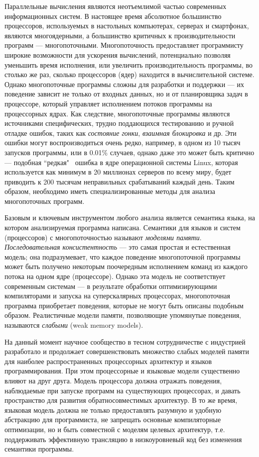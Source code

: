 
{\actuality}
Параллельные вычисления являются неотъемлимой частью современных
информационных систем. В настоящее время абсолютное большинство процессоров, используемых
в настольных компьютерах, серверах и смартфонах, являются многоядерными,
а большинство критичных к производительности программ --- многопоточными.
Многопоточность предоставляет программисту широкие возможности для ускорения вычислений,
потенциально позволяя уменьшить время исполнения, или увеличить производительность программы,
во столько же раз, сколько процессоров (ядер) находится в вычислительной системе.
Однако многопоточные программы сложны для разработки и поддержки --- их поведение
зависит не только от входных данных, но и от планировщика задач в процессоре, который
управляет исполнением потоков программы на процессорных ядрах.
Как следствие, многопоточные программы являются источниками специфических, трудно поддающихся
тестированию и ручной отладке ошибок, таких как \emph{состояние гонки}, \emph{взаимная блокировка} и др.
Эти ошибки могут воспроизводиться очень редко, например, в одном из 10 тысяч запусков
программы, или в 0.01\% случаев, однако даже это может быть критично ---
подобная ``редкая" \, ошибка в ядре операционной системы Linux, которая
используется как минимум в 20 миллионах серверов по всему миру, будет приводить
к 200 тысячам неправильных срабатываний каждый день.
Таким образом, необходимо иметь специализированные методы для анализа многопоточных программ.

Базовым и ключевым инструментом любого анализа является семантика языка,
на котором анализируемая программа написана. Семантики для языков и систем (процессоров)
с многопоточностью называют \emph{моделями памяти}.
\emph{Последовательная консистентность} --- это самая простая и естественная модель;
она подразумевает, что каждое поведение многопоточной программы может быть
получено некоторым поочередным исполнением команд из каждого потока на одном ядре
(процессоре). Однако эта модель не соответствует современным системам ---
в результате обработки оптимизирующими компиляторами и запуска на суперскалярных 
процессорах, многопоточная программа приобретает поведения, которые не могут
быть описаны подобным образом. Реалистичные модели памяти, позволяющие
упомянутые поведения, называются \emph{слабыми} (weak memory models).

На данный момент научное сообщество в тесном сотрудничестве с индустрией
разработало и продолжает совершенствовать множество слабых моделей памяти для
наиболее распространенных процессорных архитектур и языков программирования.
При этом процессорные и языковые модели существенно влияют на друг друга.
Модель процессора должна отражать поведения, наблюдаемые при запуске программ
на существующих процессорах, и давать пространство для развития
обратносовместимых архитектур. В то же время, языковая модель должна не только
предоставлять разумную и удобную абстракцию для программиста, не запрещать основные
компиляторные оптимизации, но и быть совместной с моделям целевых архитектур,
т.е. поддерживать эффективную трансляцию в низкоуровневый код без изменения
семантики программы.

